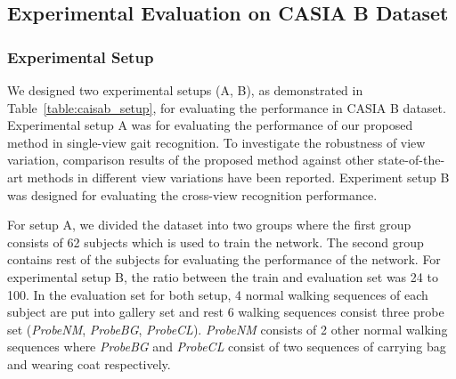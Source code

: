 \subsection{Experimental Evaluation on CASIA B Dataset}
\subsubsection{Experimental Setup}
We designed two experimental setups (A, B), as demonstrated in Table~\ref{table:caisab_setup}, for evaluating the performance in CASIA B dataset. Experimental setup A was for evaluating the performance of our proposed method in single-view gait recognition. To investigate the robustness of view variation, comparison results of the proposed method against other state-of-the-art methods in different view variations have been reported. Experiment setup B was designed for evaluating the cross-view recognition performance. 

For setup A,  we divided the dataset into two groups where the first group consists of 62 subjects which is used to train the network. The second group contains rest of the subjects for evaluating the performance of the network. For experimental setup B, the ratio between the train and evaluation set was 24 to 100. In the evaluation set for both setup, 4 normal walking sequences of each subject are put into gallery set and rest 6 walking sequences consist three probe set (\textit{ProbeNM}, \textit{ProbeBG}, \textit{ProbeCL}). \textit{ProbeNM} consists of 2 other normal walking sequences where \textit{ProbeBG} and \textit{ProbeCL} consist of two sequences of carrying bag and wearing coat respectively.

